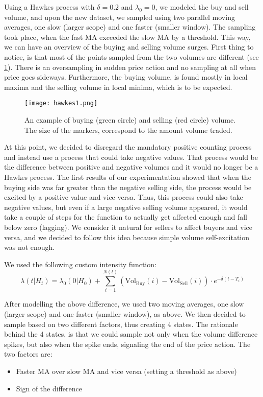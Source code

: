 Using a Hawkes process with \( \delta = 0.2 \) and \( \lambda_0 = 0 \), we modeled the buy and sell volume, and upon the new dataset, we sampled using two parallel moving averages, one slow (larger scope) and one faster (smaller window). The sampling took place, when the fast MA exceeded the slow MA by a threshold. This way, we can have an overview of the buying and selling volume surges. First thing to notice, is that most of the points sampled from the two volumes are different (see \ref{fig:hawkes1}). There is an oversampling in sudden price action and no sampling at all when price goes sideways. Furthermore, the buying volume, is found mostly in local maxima and the selling volume in local minima, which is to be expected.

\begin{figure}[H]
    \centering
    \texttt{[image: hawkes1.png]}
    \caption{An example of buying (green circle) and selling (red circle) volume. The size of the markers, correspond to the amount volume traded.}
    \label{fig:hawkes1}
\end{figure}


At this point, we decided to disregard the mandatory positive counting process and instead use a process that could take negative values. That process would be the difference between positive and negative volumes and it would no longer be a Hawkes process. The first results of our experimentation showed that when the buying side was far greater than the negative selling side, the process would be excited by a positive value and vice versa. Thus, this process could also take negative values, but even if a large negative selling volume appeared, it would take a couple of steps for the function to actually get affected enough and fall below zero (lagging). We consider it natural for sellers to affect buyers and vice versa, and we decided to follow this idea because simple volume self-excitation was not enough.

We used the following custom intensity function: 
\[ \lambda(t|H_t) = \lambda_0(0|H_0) + \sum_{i=1}^{N(t)}(\text{Vol}_{\text{Buy}}(i) - \text{Vol}_{\text{Sell}}(i)) \cdot e^{-\delta(t-T_i)} \]

After modelling the above difference, we used two moving averages, one slow (larger scope) and one faster (smaller window), as above. We then decided to sample based on two different factors, thus creating 4 states. The rationale behind the 4 states, is that we could sample not only when the volume difference spikes, but also when the spike ends, signaling the end of the price action.
The two factors are:
\begin{itemize}
\item Faster MA over slow MA and vice versa (setting a threshold as above)
\item Sign of the difference 
\end{itemize}


